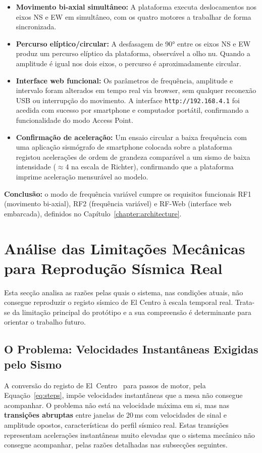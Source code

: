 \begin{itemize}
    \item \textbf{Movimento bi-axial simultâneo:} A plataforma executa deslocamentos nos eixos NS e EW em simultâneo, com os quatro motores a trabalhar de forma sincronizada.
    \item \textbf{Percurso elíptico/circular:} A desfasagem de 90° entre os eixos NS e EW produz um percurso elíptico da plataforma, observável a olho nu. Quando a amplitude é igual nos dois eixos, o percurso é aproximadamente circular.
    \item \textbf{Interface web funcional:} Os parâmetros de frequência, amplitude e intervalo foram alterados em tempo real via browser, sem qualquer reconexão USB ou interrupção do movimento. A interface \texttt{http://192.168.4.1} foi acedida com sucesso por smartphone e computador portátil, confirmando a funcionalidade do modo Access Point.
    \item \textbf{Confirmação de aceleração:} Um ensaio circular a baixa frequência com uma aplicação sismógrafo de smartphone colocada sobre a plataforma registou acelerações de ordem de grandeza comparável a um sismo de baixa intensidade ($\approx$4 na escala de Richter), confirmando que a plataforma imprime aceleração mensurável ao modelo.
\end{itemize}

\textbf{Conclusão:} o modo de frequência variável cumpre os requisitos funcionais RF1 (movimento bi-axial), RF2 (frequência variável) e RF-Web (interface web embarcada), definidos no Capítulo~\ref{chapter:architecture}.


\section{Análise das Limitações Mecânicas para Reprodução Sísmica Real}
\label{sec:limitacoes-mecanicas}

Esta secção analisa as razões pelas quais o sistema, nas condições atuais, não consegue reproduzir o registo sísmico de El Centro à escala temporal real. Trata-se da limitação principal do protótipo e a sua compreensão é determinante para orientar o trabalho futuro.


\subsection{O Problema: Velocidades Instantâneas Exigidas pelo Sismo}
\label{subsec:velocidades-sismo}

A conversão do registo de El~Centro~\cite{ElCentro1940} para passos de motor, pela Equação~\ref{eq:steps}, impõe velocidades instantâneas que a mesa não consegue acompanhar. O problema não está na velocidade máxima em si, mas nas \textbf{transições abruptas} entre janelas de 20\,ms com velocidades de sinal e amplitude opostos, características do perfil sísmico real. Estas transições representam acelerações instantâneas muito elevadas que o sistema mecânico não consegue acompanhar, pelas razões detalhadas nas subsecções seguintes.


